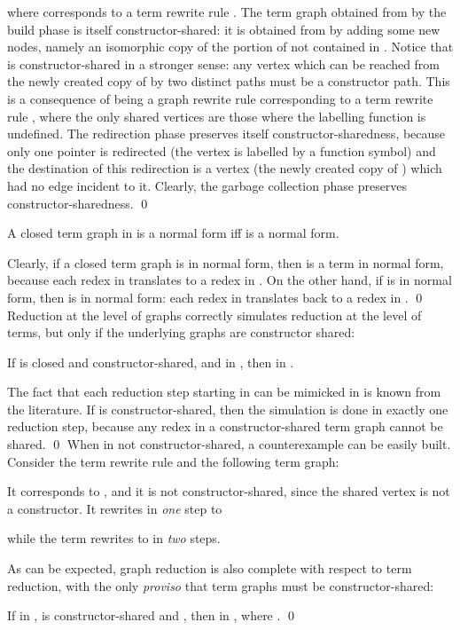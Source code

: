 \documentclass{LMCS}
\begin{document}
where  corresponds to a term rewrite
rule . The term graph  obtained from
 by the build phase is itself constructor-shared: it is obtained from
 by adding some new nodes, namely an isomorphic copy of the portion
of  not contained in . Notice
that  is constructor-shared in a stronger sense: any vertex which
can be reached from the newly created copy of  by two distinct paths
must be a constructor path. This is a consequence of  
being a graph rewrite rule corresponding to a term rewrite
rule , where the only shared vertices are those
where the labelling function is undefined. The redirection phase preserves
itself constructor-sharedness, because only one pointer is redirected
(the vertex is labelled by a function symbol) and the destination 
of this redirection is a vertex (the newly created
copy of ) which had no edge incident to it. Clearly, the
garbage collection phase preserves constructor-sharedness.
\qed
\begin{lem}\label{lemma:NFconstructorshared}
A closed term graph  in   is a 
normal form iff  is a normal form.
\end{lem}
\proof
Clearly, if a closed term graph  is in normal form,
then  is a term in normal form, because each
redex in  translates to a redex in .
On the other hand, if  is in normal form,
then  is in normal form: each redex in 
translates back to a redex in .
\qed
Reduction at the level of graphs correctly simulates reduction
at the level of terms, but only if the underlying graphs
are constructor shared:
\begin{lem}\label{lemma:CGtoC}
If  is closed and constructor-shared, and 
 in  , then
 in .
\end{lem}
\proof
The fact that each reduction step starting in  can be
mimicked in  is known
from the literature. If  is constructor-shared,
then the simulation is done in exactly one reduction step,
because any redex in a constructor-shared
term graph cannot be shared.
\qed
When  in not constructor-shared, a counterexample
can be easily built. Consider the term rewrite rule
 and the following term graph:

It corresponds to , and it is not
constructor-shared, since the shared vertex  is not a constructor. 
It rewrites in \emph{one} step to 

while the term  rewrites to  in
\emph{two} steps.

As can be expected, graph reduction is also complete with respect to
term reduction, with the only \emph{proviso} that term graphs must
be constructor-shared:
\begin{lem}\label{lemma:CtoCG}
If  in ,  is constructor-shared 
and , then
 in , where . \qed
\end{lem}
\end{document}
